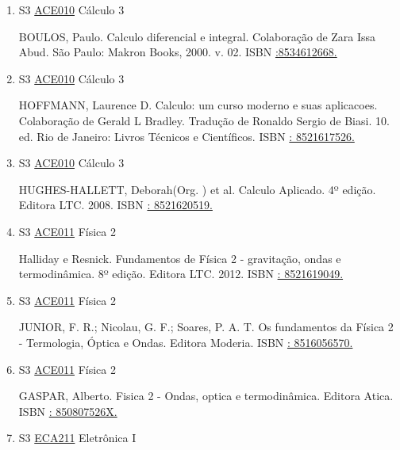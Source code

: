 \documentclass[12pt,a4paper]{book}
\begin{document}
\begin{enumerate}
  NAVIDI, William.  Probabilidade e Estatística para Ciências Exatas.  1º Edição.  2012.  Editora McGrawHill.  ISBN \href{http://www.google.com/search?hl=pt-BR&tbo=p&tbm=bks&q=isbn:: 97885805507&num=10}{: 97885805507}33.
 \item S3 \hyperref[PUD:ACE010]{ACE010} Cálculo 3

  BOULOS, Paulo.  Calculo diferencial e integral.  Colaboração de Zara Issa Abud.  São Paulo: Makron Books, 2000.  v. 02.  ISBN \href{http://www.google.com/search?hl=pt-BR&tbo=p&tbm=bks&q=isbn::8534612668.&num=10}{:8534612668.} 

 
 
 \item S3 \hyperref[PUD:ACE010]{ACE010} Cálculo 3

  HOFFMANN, Laurence D.  Calculo: um curso moderno e suas aplicacoes.  Colaboração de Gerald L Bradley. Tradução de Ronaldo Sergio de Biasi.  10.  ed.  Rio de Janeiro: Livros Técnicos e Científicos.  ISBN \href{http://www.google.com/search?hl=pt-BR&tbo=p&tbm=bks&q=isbn:: 8521617526.&num=10}{: 8521617526.} 

 
 
 \item S3 \hyperref[PUD:ACE010]{ACE010} Cálculo 3

  HUGHES-HALLETT, Deborah(Org. ) et al.  Calculo Aplicado.  4º edição.  Editora LTC.  2008.  ISBN \href{http://www.google.com/search?hl=pt-BR&tbo=p&tbm=bks&q=isbn:: 8521620519.&num=10}{: 8521620519.}
 \item S3 \hyperref[PUD:ACE011]{ACE011} Física 2

  Halliday e Resnick.  Fundamentos de Física 2 - gravitação, ondas e termodinâmica.  8º edição.  Editora LTC.  2012.  ISBN \href{http://www.google.com/search?hl=pt-BR&tbo=p&tbm=bks&q=isbn:: 8521619049.&num=10}{: 8521619049.} 

 
 
 \item S3 \hyperref[PUD:ACE011]{ACE011} Física 2

  JUNIOR, F.  R.;  Nicolau, G.  F.;  Soares, P.  A.  T.  Os fundamentos da Física 2 - Termologia, Óptica e Ondas.  Editora Moderia.  ISBN \href{http://www.google.com/search?hl=pt-BR&tbo=p&tbm=bks&q=isbn:: 8516056570.&num=10}{: 8516056570.} 

 
 
 \item S3 \hyperref[PUD:ACE011]{ACE011} Física 2

  GASPAR, Alberto.  Fisica 2 - Ondas, optica e termodinâmica.  Editora Atica.  ISBN \href{http://www.google.com/search?hl=pt-BR&tbo=p&tbm=bks&q=isbn:: 850807526X.&num=10}{: 850807526X.}
 \item S3 \hyperref[PUD:ECA211]{ECA211} Eletrônica I


\end{enumerate}
\end{document}
